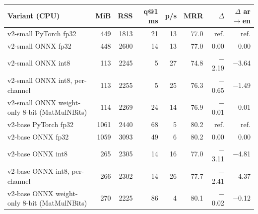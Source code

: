 \begin{tabular}{@{}lrrrrrrr@{}}
\toprule
Variant (CPU) & MiB & RSS & q@1 ms & p/s & MRR & $\Delta$ & $\Delta$ ar$\to$en \\
\midrule
v2-small PyTorch fp32 & 449 & 1813 & 21 & 13 & 77.0 & ref. & ref. \\
v2-small ONNX fp32 & 448 & 2600 & 14 & 13 & 77.0 & 0.00 & 0.00 \\
v2-small ONNX int8 & 113 & 2245 & 5 & 27 & 74.8 & $-$2.19 & $-$3.64 \\
v2-small ONNX int8, per-channel & 113 & 2255 & 5 & 25 & 76.3 & $-$0.65 & $-$1.49 \\
v2-small ONNX weight-only 8-bit (MatMulNBits) & 114 & 2269 & 24 & 14 & 76.9 & $-$0.01 & $-$0.01 \\
\midrule
v2-base PyTorch fp32 & 1061 & 2440 & 68 & 5 & 80.2 & ref. & ref. \\
v2-base ONNX fp32 & 1059 & 3093 & 49 & 6 & 80.2 & 0.00 & 0.00 \\
v2-base ONNX int8 & 265 & 2305 & 14 & 16 & 77.0 & $-$3.11 & $-$4.81 \\
v2-base ONNX int8, per-channel & 266 & 2302 & 14 & 26 & 77.7 & $-$2.41 & $-$4.37 \\
v2-base ONNX weight-only 8-bit (MatMulNBits) & 270 & 2225 & 86 & 4 & 80.1 & $-$0.02 & $-$0.12 \\
\bottomrule
\end{tabular}
